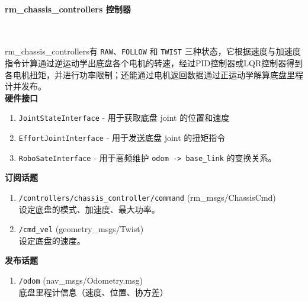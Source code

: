 \paragraph{rm\_chassis\_controllers 控制器}~{}
\par
rm\_chassis\_controllers有 \lstinline{RAW}、\lstinline{FOLLOW} 和 \lstinline{TWIST} 三种状态，它根据速度与加速度指令计算通过逆运动学出底盘各个电机的转速，经过PID控制器或LQR控制器得到各电机扭矩，并进行功率限制；还能通过电机返回数据通过正运动学解算底盘里程计并发布。\\
\textbf{硬件接口}
\begin{enumerate}
    \item \lstinline{JointStateInterface} - 用于获取底盘 joint 的位置和速度
    \item \lstinline{EffortJointInterface} - 用于发送底盘 joint 的扭矩指令
    \item \lstinline{RoboSateInterface} - 用于高频维护 \lstinline{odom -> base_link} 的变换关系。

\end{enumerate}
\textbf{订阅话题}
\begin{enumerate}
    \item \lstinline{/controllers/chassis_controller/command} (rm\_msgs/ChassisCmd)\\
    设定底盘的模式、加速度、最大功率。
    \item \lstinline{/cmd_vel} (geometry\_msgs/Twist)\\
    设定底盘的速度。
\end{enumerate}
\textbf{发布话题}
\begin{enumerate}
    \item  \lstinline{/odom} (nav\_msgs/Odometry.msg)\\
    底盘里程计信息（速度、位置、协方差）
\end{enumerate}


